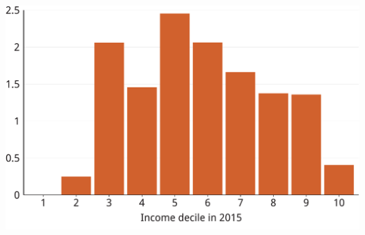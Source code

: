 \documentclass[tikz]{standalone}\usepackage[]{graphicx}\usepackage[]{color}
\newenvironment{knitrout}{}{} %
\begin{document}
\begin{knitrout}
\color{fgcolor}
\includegraphics[width=11.000in,height=7.00in]{./b5-figure/FISCAL-Figure4-1} 

\end{knitrout}
\end{document}
